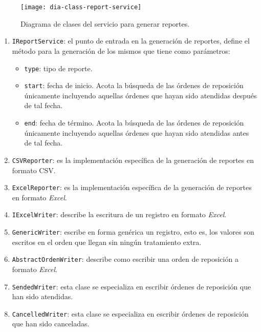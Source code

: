 \begin{figure}[h]
	\centering
	\texttt{[image: dia-class-report-service]}
	\caption{Diagrama de clases del servicio para generar reportes.}
	\label{fig:dia-class-report-service}
\end{figure}

\begin{enumerate}
	\item \texttt{IReportService}: el punto de entrada en la generación de reportes, define el método para la generación de los mismos que tiene como parámetros:
	\begin{itemize}
	 	\item \texttt{type}: tipo de reporte.
	 	\item \texttt{start}: fecha de inicio. Acota la búsqueda de las órdenes de reposición únicamente incluyendo aquellas órdenes que hayan sido atendidas después de tal fecha.
	 	\item \texttt{end}: fecha de término. Acota la búsqueda de las órdenes de reposición únicamente incluyendo aquellas órdenes que hayan sido atendidas antes de tal fecha.
	 \end{itemize}
	\item \texttt{CSVReporter}: es la implementación específica de la generación de reportes en formato CSV.
	\item \texttt{ExcelReporter}: es la implementación específica de la generación de reportes en formato \textit{Excel}\textsuperscript{\textcopyright}.
	\item \texttt{IExcelWriter}: describe la escritura de un registro en formato \textit{Excel}\textsuperscript{\textcopyright}.
	\item \texttt{GenericWriter}: escribe en forma genérica un registro, esto es, los valores son escritos en el orden que llegan sin ningún tratamiento extra. 
	\item \texttt{AbstractOrdenWriter}: describe como escribir una orden de reposición a formato \textit{Excel}\textsuperscript{\textcopyright}.
	\item \texttt{SendedWriter}: esta clase se especializa en escribir órdenes de reposición que han sido atendidas.
	\item \texttt{CancelledWriter}: esta clase se especializa en escribir órdenes de reposición que han sido canceladas.
\end{enumerate}



